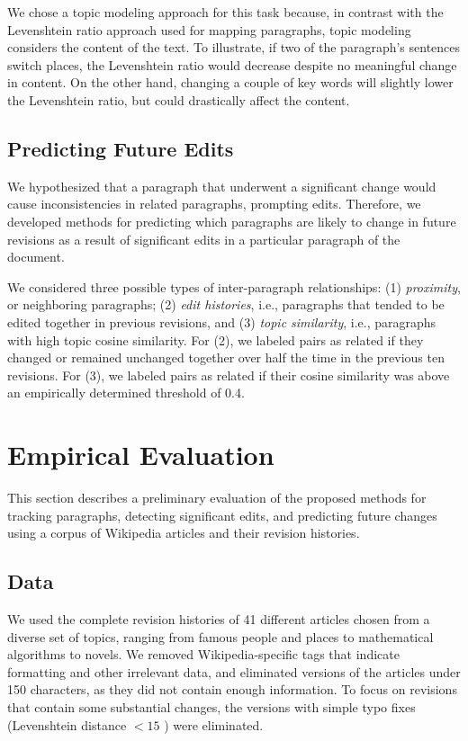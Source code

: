 We chose a topic modeling approach for this task because, in contrast
with the Levenshtein ratio approach used for mapping paragraphs, topic
modeling considers the content of the text. To illustrate, if two of the
paragraph's sentences switch places, the Levenshtein ratio would
decrease despite no meaningful change in content. On the other hand,
changing a couple of key words will slightly lower the Levenshtein
ratio, but could drastically affect the content.

\subsection{Predicting Future Edits}\label{predicting-future-edits}

We hypothesized that a paragraph that underwent a significant change
would cause inconsistencies in related paragraphs, prompting edits.
Therefore, we developed methods for predicting which paragraphs are
likely to change in future revisions as a result of significant edits in
a particular paragraph of the document.

We considered three possible types of inter-paragraph relationships: (1)
\emph{proximity}, or neighboring paragraphs; (2) \emph{edit histories},
i.e., paragraphs that tended to be edited together in previous
revisions, and (3) \emph{topic similarity}, i.e., paragraphs with high
topic cosine similarity. For (2), we labeled pairs as related if they
changed or remained unchanged together over half the time in the
previous ten revisions. For (3), we labeled pairs as related if their
cosine similarity was above an empirically determined threshold of 0.4.

\section{Empirical Evaluation}\label{empirical-evaluation}

This section describes a preliminary evaluation of the proposed methods
for tracking paragraphs, detecting significant edits, and predicting
future changes using a corpus of Wikipedia articles and their revision
histories.

\subsection{Data}\label{data}

We used the complete revision histories of 41 different articles chosen
from a diverse set of topics, ranging from famous people and places to
mathematical algorithms to novels. We removed Wikipedia-specific tags
that indicate formatting and other irrelevant data, and eliminated
versions of the articles under 150 characters, as they did not contain
enough information. To focus on revisions that contain some substantial
changes, the versions with simple typo fixes (Levenshtein distance
\(< 15\) ) were eliminated.

